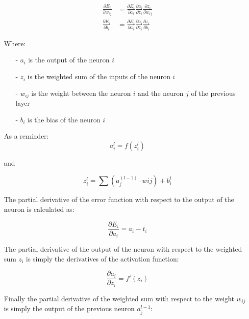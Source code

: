 \begin{equation}
    \begin{split}
        \label{eq:chainrule}
        \frac{\partial E_i}{\partial w_{ij}} & = \frac{\partial E_i}{\partial a_i} \frac{\partial a_i}{\partial z_{i}} \frac{\partial z_{i}}{\partial w_{ij}} \\
        \frac{\partial E_i}{\partial b_i} & = \frac{\partial E_i}{\partial a_i} \frac{\partial a_i}{\partial z_{i}} \frac{\partial z_i}{\partial b_i}
    \end{split}
\end{equation}

\noindent
Where:

\begin{itemize}
    \item[-] $a_i$ is the output of the neuron $i$
    \item[-] $z_i$ is the weighted sum of the inputs of the neuron $i$ 
    \item[-] $w_{ij}$ is the weight between the neuron $i$ and the neuron $j$ of the previous layer
    \item[-] $b_i$ is the bias of the neuron $i$
\end{itemize}

\noindent
As a reminder:
\begin{equation}
        a_i^l = f(z_i^l)
\end{equation}

\noindent
and

\begin{equation}
    z_i^l =  \sum {(a_j^{(l-1)}\cdot wij)} + b_i^l 
\end{equation}

The partial derivative of the error function with respect to the output of the neuron is calculated as:

\begin{equation}
    \label{eq:partialinput}
    \frac{\partial E_i}{\partial a_i} = a_i - t_i
\end{equation}

The partial derivative of the output of the neuron with respect to the weighted sum $z_i$ is simply the derivatives
of the activation function: 

\begin{equation}
    \label{eq:partialweightedsum}
    \frac{\partial a_i}{\partial z_{i}} = f'(z_i)
\end{equation}

Finally the partial derivative of the weighted sum with respect to the weight $w_{ij}$ is simply the output of the
previous neuron $a_j^{l-1}$:

